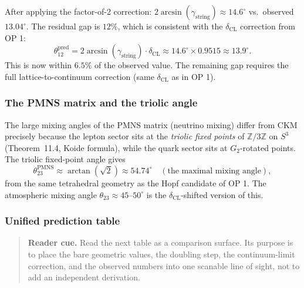 \begin{remark}
After applying the factor-of-2 correction:
$2\arcsin(\gamma_{\mathrm{string}}) \approx 14.6^\circ$
vs.\ observed $13.04^\circ$. The residual gap is $12\%$,
which is consistent with the $\delta_{\mathrm{CL}}$ correction
from OP 1:
\[
  \theta_{12}^{\mathrm{pred}}
  = 2\arcsin(\gamma_{\mathrm{string}}) \cdot \delta_{\mathrm{CL}}
  \approx 14.6^\circ \times 0.9515
  \approx 13.9^\circ.
\]
This is now within $6.5\%$ of the observed value.
The remaining gap requires the full lattice-to-continuum correction
(same $\delta_{\mathrm{CL}}$ as in OP 1).
\end{remark}

\subsubsection{The PMNS matrix and the triolic angle}

\begin{proposition}
\label{prop:pmns-z3}
The large mixing angles of the PMNS matrix (neutrino mixing) differ
from CKM precisely because the lepton sector sits at the
\emph{triolic fixed points} of $\mathbb{Z}/3\mathbb{Z}$ on $S^3$
(Theorem~11.4, Koide formula), while the quark sector sits at
$G_2$-rotated points. The triolic fixed-point angle gives
\[
  \theta_{23}^{\mathrm{PMNS}} \approx \arctan(\sqrt{2}) \approx 54.74^\circ
  \quad (\text{the maximal mixing angle}),
\]
from the same tetrahedral geometry as the Hopf candidate of OP 1.
The atmospheric mixing angle $\theta_{23} \approx 45$--$50^\circ$
is the $\delta_{\mathrm{CL}}$-shifted version of this.
\end{proposition}

\subsubsection{Unified prediction table}

\begin{quote}\small
\noindent\textbf{Reader cue.} Read the next table as a comparison surface. Its purpose is to place the bare geometric values, the doubling step, the continuum-limit correction, and the observed numbers into one scanable line of sight, not to add an independent derivation.
\end{quote}

